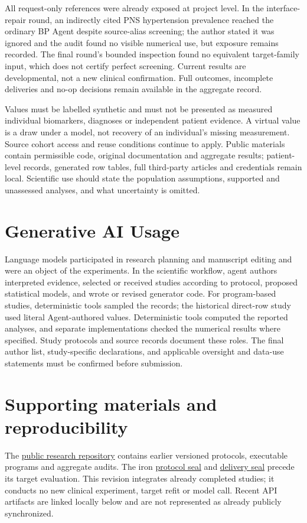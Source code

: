 \documentclass[11pt,letterpaper]{article}
\begin{document}
All request-only references were already exposed at project level. In the interface-repair round, an indirectly cited PNS hypertension prevalence reached the ordinary BP Agent despite source-alias screening; the author stated it was ignored and the audit found no visible numerical use, but exposure remains recorded. The final round's bounded inspection found no equivalent target-family input, which does not certify perfect screening. Current results are developmental, not a new clinical confirmation. Full outcomes, incomplete deliveries and no-op decisions remain available in the aggregate record.


Values must be labelled synthetic and must not be presented as measured individual biomarkers, diagnoses or independent patient evidence. A virtual value is a draw under a model, not recovery of an individual's missing measurement. Source cohort access and reuse conditions continue to apply. Public materials contain permissible code, original documentation and aggregate results; patient-level records, generated row tables, full third-party articles and credentials remain local. Scientific use should state the population assumptions, supported and unassessed analyses, and what uncertainty is omitted.


\section{Generative AI Usage}

Language models participated in research planning and manuscript editing and were an object of the experiments. In the scientific workflow, agent authors interpreted evidence, selected or received studies according to protocol, proposed statistical models, and wrote or revised generator code. For program-based studies, deterministic tools sampled the records; the historical direct-row study used literal Agent-authored values. Deterministic tools computed the reported analyses, and separate implementations checked the numerical results where specified. Study protocols and source records document these roles. The final author list, study-specific declarations, and applicable oversight and data-use statements must be confirmed before submission.


\section*{Supporting materials and reproducibility}

The \href{https://github.com/ziwang11112/evidence-guided-virtual-cohorts-2026}{public research repository} contains earlier versioned protocols, executable programs and aggregate audits. The iron \href{https://github.com/ziwang11112/evidence-guided-virtual-cohorts-2026/commit/bedd845768c1c938768f58fce685f53cbf97f3df}{protocol seal} and \href{https://github.com/ziwang11112/evidence-guided-virtual-cohorts-2026/commit/c88192edeb0bc63b60d0bfe6e3a7282ced9d2975}{delivery seal} precede its target evaluation. This revision integrates already completed studies; it conducts no new clinical experiment, target refit or model call. Recent API artifacts are linked locally below and are not represented as already publicly synchronized.
\end{document}
